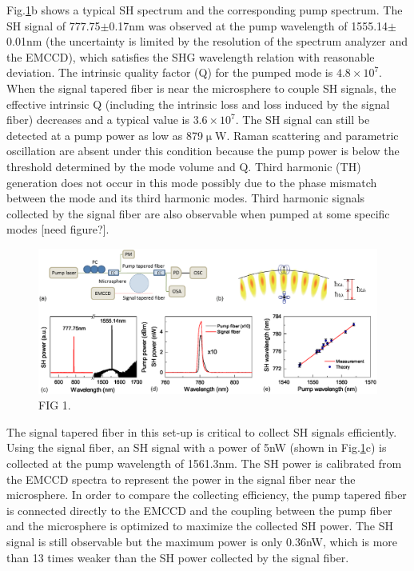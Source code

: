 \documentclass[a4paper,8pt,hyperref, twocolumn]{article}
\begin{document}
Fig.\ref{pic:Fig1}b shows a typical SH spectrum and the corresponding pump spectrum. The SH signal of 777.75$\pm$0.17nm was observed at the pump wavelength of 1555.14$\pm$0.01nm (the uncertainty is limited by the resolution of the spectrum analyzer and the EMCCD), which satisfies the SHG wavelength relation with reasonable deviation. The intrinsic quality factor (Q) for the pumped mode is $4.8\times10^7$. When the signal tapered fiber is near the microsphere to couple SH signals, the effective intrinsic Q (including the intrinsic loss and loss induced by the signal fiber) decreases and a typical value is $3.6\times 10^7$. The SH signal can still be detected at a pump power as low as 879$\upmu $W. Raman scattering and parametric oscillation are absent under this condition because the pump power is below the threshold determined by the mode volume and Q\cite{spillane2002ultralow, kippenberg2004kerr}. Third harmonic (TH) generation does not occur in this mode possibly due to the phase mismatch between the mode and its third harmonic modes\cite{carmon2007visible}. Third harmonic signals  collected by the signal fiber are also observable when pumped at some specific modes [need figure?]. 

\begin{figure}[!ht]
\centering
\includegraphics[width=18cm]{Fig1.eps}
\caption{FIG 1.}
\label{pic:Fig1}
\end{figure}

The signal tapered fiber in this set-up is critical to collect SH signals efficiently. Using the signal fiber, an SH signal with a power of 5nW (shown in Fig.\ref{pic:Fig1}c) is collected at the pump wavelength of 1561.3nm. The SH power is calibrated from the EMCCD spectra to represent the power in the signal fiber near the microsphere. In order to compare the collecting efficiency, the pump tapered fiber is connected directly to the EMCCD and the coupling between the pump fiber and the microsphere is optimized to maximize the collected SH power. The SH signal is still observable but the maximum power is only 0.36nW, which is more than 13 times weaker than the SH power collected by the signal fiber.
\end{document}
